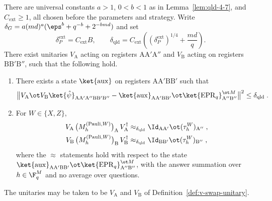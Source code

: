 \begin{lemma}\label{lem:qld-unitary}
	\leanok
	There are universal constants $a>1$, $0<b<1$ as in
	Lemma~\ref{lem:qld-4-7}, and $C_{\mathrm{ext}}\geq1$, all chosen before
	the parameters and strategy. Write $\delta_G=a(md)^a
	(\eps^b+q^{-b}+2^{-bmd})$ and set
	\[
		\delta_P^{\mathrm{ext}}=C_{\mathrm{ext}}B,
		\qquad
		\delta_{\mathrm{qld}}=C_{\mathrm{ext}}
		\left((\delta_P^{\mathrm{ext}})^{1/4}+\frac{md}{q}\right).
	\]
	There exist unitaries $V_{\mathrm{A}}$ acting on registers $\mathrm{A}\mathrm{A}'\mathrm{A}''$ and $V_{\mathrm{B}}$ acting on registers $\mathrm{B}\mathrm{B}'\mathrm{B}''$, such that the following hold.
	\begin{enumerate}
		\item There exists a state $\ket{\mathrm{aux}}$ on registers $\mathrm{A}\mathrm{A}'\mathrm{B}\mathrm{B}'$ such that
		\[
			\bigl\| V_{\mathrm{A}} \ot V_{\mathrm{B}} \ket{\hat{\psi}}_{\mathrm{A}\mathrm{A}'\mathrm{A}''\mathrm{B}\mathrm{B}'\mathrm{B}''} - \ket{\mathrm{aux}}_{\mathrm{A}\mathrm{A}'\mathrm{B}\mathrm{B}'} \ot \ket{\mathrm{EPR}_q}^{\ot M}_{\mathrm{A}''\mathrm{B}''} \bigr\|^2 \leq \delta_{\mathrm{qld}}\;.
		\]
		\item For $W \in \{X,Z\}$,
		\begin{align*}
			V_{\mathrm{A}} \, \bigl(M^{(\mathrm{Pauli},W)}_h \bigr)_{\mathrm{A}} \, V_{\mathrm{A}}^\dagger &\approx_{\delta_{\mathrm{qld}}} \Id_{\mathrm{A}\mathrm{A}'} \ot (\tau^W_h)_{\mathrm{A}''}\;, \\
			V_{\mathrm{B}} \, \bigl(M^{(\mathrm{Pauli},W)}_h \bigr)_{\mathrm{B}} \, V_{\mathrm{B}}^\dagger &\approx_{\delta_{\mathrm{qld}}} \Id_{\mathrm{B}\mathrm{B}'} \ot (\tau^W_h)_{\mathrm{B}''}\;,
		\end{align*}
		where the $\approx$ statements hold with respect to the state $\ket{\mathrm{aux}}_{\mathrm{A}\mathrm{A}'\mathrm{B}\mathrm{B}'} \ot \ket{\mathrm{EPR}_q}^{\ot M}_{\mathrm{A}''\mathrm{B}''}$, with the answer summation over $h \in \F_q^{M}$ and no average over questions.
	\end{enumerate}
	The unitaries may be taken to be $V_{\mathrm{A}}$ and $V_{\mathrm{B}}$ of Definition~\ref{def:v-swap-unitary}.

\end{lemma}
